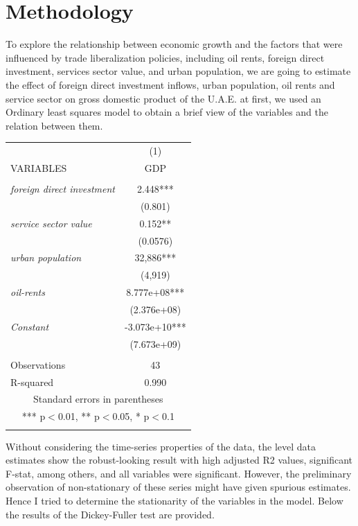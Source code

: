 \documentclass[12pt,a4 paper,title page]{article}
\begin{document}
\section{Methodology}
\begin{flushleft}
To explore the relationship between economic growth and the factors that were influenced by trade liberalization policies, including oil rents, foreign direct investment, services sector value, and urban population, we are going to estimate the effect of foreign direct investment inflows, urban population, oil rents and service sector on gross domestic product of the U.A.E.
at first, we used an Ordinary least squares model to obtain a brief view of the variables and the relation between them.
\end{flushleft} \hfill \break \hfill \break \begin{tabular}{lc} \hline
 & (1) \\
VARIABLES & GDP \\ \hline
 &  \\
\textit{foreign direct investment} & 2.448*** \\
 & (0.801) \\ \hfill\break
\textit{service sector value} & 0.152** \\
 & (0.0576) \\  \hfill\break
\textit{urban population} & 32,886*** \\
 & (4,919) \\  \hfill \break
\textit{oil-rents} & 8.777e+08*** \\
 & (2.376e+08) \\ \hfill\break
 \hfill\break
\textit{Constant} & -3.073e+10*** \\
 & (7.673e+09) \\
 &  \\
Observations & 43 \\
 R-squared & 0.990 \\ \hline
\multicolumn{2}{c}{ Standard errors in parentheses} \\
\multicolumn{2}{c}{ *** p$<$0.01, ** p$<$0.05, * p$<$0.1} \\
\label{table1}
\end{tabular}
\hfill \break
\hfill \break
Without considering the time-series properties of the data, the level data estimates show the robust-looking result with high adjusted R2 values, significant F-stat, among others, and all variables were significant. However, the preliminary observation of non-stationary of these series might have given spurious estimates. Hence I tried to determine the stationarity of the variables in the model. Below the results of the Dickey-Fuller test are provided.
\end{document}
